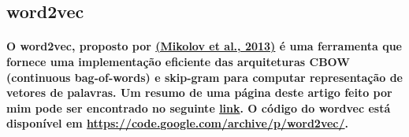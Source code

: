 \documentclass[a4paper]{article}    %
\begin{document}
\subsection{word2vec}

\paragraph{O word2vec, proposto por \href{https://github.com/ito-rafael/machine-learning/blob/master/papers/NLP/2013\%20-\%20\%5Bword2vec\%5D\%20Efficient\%20Estimation\%20of\%20Word\%20Representations\%20in\%20Vector\%20Space\%20\%5BGoogle\%20Inc\%5D.pdf}{(Mikolov et al., 2013)} é uma ferramenta que fornece uma implementação eficiente das arquiteturas CBOW (continuous bag-of-words) e skip-gram para computar representação de vetores de palavras. Um resumo de uma página deste artigo feito por mim pode ser encontrado no seguinte \href{https://github.com/ito-rafael/machine-learning/blob/master/one-page\%20papers\%20summary/2013\%20-\%20\%5Bword2vec\%5D\%20Efficient\%20Estimation\%20of\%20Word\%20Representations\%20in\%20Vector\%20Space\%20\%5BGoogle\%20Inc\%5D.pdf}{link}. O código do wordvec está disponível em \href{https://code.google.com/archive/p/word2vec/}{https://code.google.com/archive/p/word2vec/}.}

\graphicspath{{../figures/Q10/}}
\end{document}

